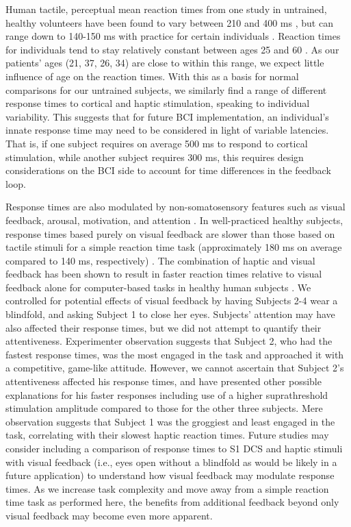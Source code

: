 Human tactile, perceptual mean reaction times from one study in untrained, healthy volunteers have been found to vary between 210 and 400 ms \cite{Lele1954a}, but can range down to 140-150 ms with practice for certain individuals \cite{Woodworth1954a} . Reaction times for individuals tend to stay relatively constant between ages 25 and 60 \cite{Woodworth1954a}. As our patients’ ages (21, 37, 26, 34) are close to within this range, we expect little influence of age on the reaction times. With this as a basis for normal comparisons for our untrained subjects, we similarly find a range of different response times to cortical and haptic stimulation, speaking to individual variability. This suggests that for future BCI implementation, an individual’s innate response time may need to be considered in light of variable latencies. That is, if one subject requires on average 500 ms to respond to cortical stimulation, while another subject requires 300 ms, this requires design considerations on the BCI side to account for time differences in the feedback loop.


Response times are also modulated by non-somatosensory features such as visual feedback, arousal, motivation, and attention \cite{Woodworth1954a}. In well-practiced healthy subjects, response times based purely on visual feedback are slower than those based on tactile stimuli for a simple reaction time task (approximately 180 ms on average compared to 140 ms, respectively) \cite{Woodworth1954a}. The combination of haptic and visual feedback has been shown to result in faster reaction times relative to visual feedback alone for computer-based tasks in healthy human subjects \cite{Vitense2003a}. We controlled for potential effects of visual feedback by having Subjects 2-4 wear a blindfold, and asking Subject 1 to close her eyes. Subjects’ attention may have also affected their response times, but we did not attempt to quantify their attentiveness. Experimenter observation suggests that Subject 2, who had the fastest response times, was the most engaged in the task and approached it with a competitive, game-like attitude. However, we cannot ascertain that Subject 2’s attentiveness affected his response times, and have presented other possible explanations for his faster responses including use of a higher suprathreshold stimulation amplitude compared to those for the other three subjects. Mere observation suggests that Subject 1 was the groggiest and least engaged in the task, correlating with their slowest haptic reaction times. Future studies may consider including a comparison of response times to S1 DCS and haptic stimuli with visual feedback (i.e., eyes open without a blindfold as would be likely in a future application) to understand how visual feedback may modulate response times. As we increase task complexity and move away from a simple reaction time task as performed here, the benefits from additional feedback beyond only visual feedback may become even more apparent.

